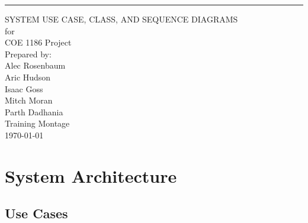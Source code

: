 \documentclass{scrreprt}
\begin{document}
\begin{flushright}
    \rule{16cm}{5pt}\vskip1cm
    \begin{bfseries}
        \Huge{SYSTEM USE CASE, CLASS, AND SEQUENCE DIAGRAMS}\\
        \vspace{.9cm}
        for\\
        \vspace{.9cm}
        COE 1186 Project\\
        \vspace{.9cm}
        \vspace{.9cm}
        Prepared by:\\
        Alec Rosenbaum\\
        Aric Hudson\\
        Isaac Goss\\
        Mitch Moran\\
	Parth Dadhania\\
        \vspace{1.9cm}
        Training Montage\\
        \vspace{.9cm}
        \today\\
    \end{bfseries}
\end{flushright}

\tableofcontents

\chapter{System Architecture}

\section{Use Cases}
\end{document}
